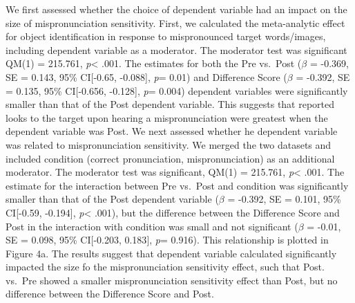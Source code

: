 \documentclass[man]{apa6}
\theoremstyle{definition}
\theoremstyle{definition}
\theoremstyle{definition}
\theoremstyle{remark}
\begin{document}
We first assessed whether the choice of dependent variable had an impact
on the size of mispronunciation sensitivity. First, we calculated the
meta-analytic effect for object identification in response to
mispronounced target words/images, including dependent variable as a
moderator. The moderator test was significant QM(1) = 215.761,
\emph{p}\textless{} .001. The estimates for both the Pre vs.~Post
(\(\beta\) = -0.369, SE = 0.143, 95\% CI{[}-0.65, -0.088{]}, \emph{p}=
0.01) and Difference Score (\(\beta\) = -0.392, SE = 0.135, 95\%
CI{[}-0.656, -0.128{]}, \emph{p}= 0.004) dependent variables were
significantly smaller than that of the Post dependent variable. This
suggests that reported looks to the target upon hearing a
mispronunciation were greatest when the dependent variable was Post. We
next assessed whether he dependent variable was related to
mispronunciation sensitivity. We merged the two datasets and included
condition (correct pronunciation, mispronunciation) as an additional
moderator. The moderator test was significant, QM(1) = 215.761,
\emph{p}\textless{} .001. The estimate for the interaction between Pre
vs.~Post and condition was significantly smaller than that of the Post
dependent variable (\(\beta\) = -0.392, SE = 0.101, 95\% CI{[}-0.59,
-0.194{]}, \emph{p}\textless{} .001), but the difference between the
Difference Score and Post in the interaction with condition was small
and not significant (\(\beta\) = -0.01, SE = 0.098, 95\% CI{[}-0.203,
0.183{]}, \emph{p}= 0.916). This relationship is plotted in Figure 4a.
The results suggest that dependent variable calculated significantly
impacted the size fo the mispronunciation sensitivity effect, such that
Post. vs.~Pre showed a smaller mispronunciation sensitivity effect than
Post, but no difference between the Difference Score and Post.
\end{document}
